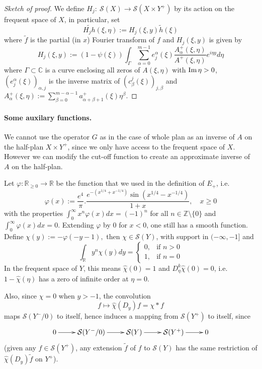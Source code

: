 \begin{proof}[Sketch of proof]
We define \(H_j:\ \mathcal{S}(X) \longrightarrow \mathcal{S}(X\times Y^+)\) by its
action on the frequent space of \(X\), in particular, set
\[
\tilde{H_j h}(\xi,\eta):= H_j(\xi,y) \tilde h(\xi)
\]
where \(\tilde f\) is the partial (in
\(x\)) Fourier transform of \(f\) and \(H_j(\xi,y)\) is given by
\[
 H_j(\xi,y):= (1-\psi(\xi))\int_\Gamma \sum_{\alpha= 0}^{m-1}e^\alpha_j(\xi)
 \frac{A_\alpha^+(\xi,\eta)}{A^+(\xi,\eta)}e^{i\eta y}d\eta
\]
where \(\Gamma\subset \mathbb{C}\) is a curve enclosing all zeros of \(A(\xi,\eta)\) with \(\mathop{\rm Im}\nolimits
\eta >0\), \((e^\alpha_j(\xi))_{\alpha,j}\) is the inverse matrix of \((c^j_\beta(\xi))_{j,\beta}\) and \(A_\alpha^+(\xi,\eta):= \sum_{\beta=0}^{m-\alpha-1} a^+_{\alpha+\beta+1}(\xi)\eta^\beta\).
\end{proof}

\paragraph{Some auxilary functions.}
\label{sec:org25e9d81}
We cannot use the operator \(G\) as in the case of whole plan as an inverse of \(A\)
on the half-plan \(X\times Y^+\), since we only have access to the frequent space of \(X\). However we can modify the cut-off function to create an approximate inverse of \(A\) on the half-plan.

Let \(\varphi: \mathbb{R}_{\geq 0}\longrightarrow \mathbb{R}\) be the function that we used in the
definition of \(E_+\), i.e.
\[
\varphi(x) := \frac{e^4}{\pi}.\frac{e^{-(x^{1/4} + x^{-1/4})} \sin(x^{1/4} -
x^{-1/4})}{1+x} , \quad x\geq 0
\]
with the properties \(\int_0^{\infty}x^n \varphi(x)dx = (-1)^n\) for all \(n\in
\mathbb{Z}\setminus\{0\}\) and \(\int_0^\infty \varphi(x)dx=0\).
Extending \(\varphi\) by 0 for \(x<0\), one still has a smooth function. Define
\(\chi(y):=-\varphi(-y-1),\)
then \(\chi \in \mathcal{S}(Y)\), with support in \((-\infty,-1]\) and
\[
\int_{\mathbb{R}} y^n\chi(y) dy = \begin{cases}
0,  & \text{if $n > 0$} \\
1, & \text{if $n=0$}
\end{cases}
\]
In the frequent space of \(Y\), this means \(\hat\chi(0)=1\) and \(D^k_{\eta}\hat\chi(0)=0\), i.e. \(1-\hat\chi(\eta)\) has a zero of infinite order at \(\eta=0\).

Also, since \(\chi = 0\) when \(y>-1\), the convolution 
\[ 
f\longmapsto \hat\chi(D_y) f = \chi * f 
\]
maps \(\mathcal{S}(Y^-/0)\) to itself, hence induces a mapping from \(\mathcal{S}(Y^+)\) to itself, since
\[
 \xymatrix{
0 \ar@{->}[r] & \mathcal{S}(Y^-/0) \ar@{->}[r] & \mathcal{S}(Y) \ar@{->}[r] & \mathcal{S}(Y^+) \ar@{->}[r] & 0
}
\]
(given any \(f\in \mathcal{S}(Y^+)\), any extension \(\tilde f\) of \(f\)
to \(\mathcal{S}(Y)\) has the same restriction of \(\hat\chi(D_y)\tilde f\) on \(Y^+\)).

